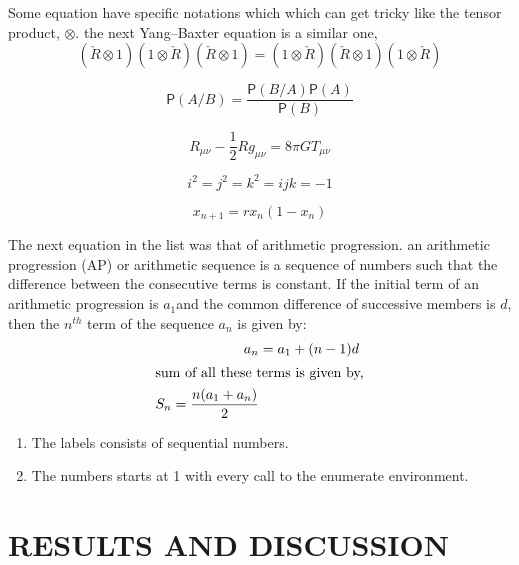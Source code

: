 \documentclass[12pt,a4paper]{report}
\newcommand*{\prob}{\mathsf{P}}
\begin{document}
Some equation have specific notations which which can get tricky like the tensor product, $\otimes$. the next Yang–Baxter equation is a similar one,
\begin{equation}
    \label{eq:7}
    (\check{R}\otimes1)(1\otimes\check{R})(\check{R}\otimes1) = (1\otimes\check{R})(\check{R}\otimes1)(1\otimes\check{R})
\end{equation}

\begin{equation}
    \label{eq:8}
    \prob(A/B) = \frac{\prob (B/A)  \prob (A)}{\prob (B)}
\end{equation}

\begin{equation}
    \label{eq:9}
    R_{\mu\nu} - \frac{1}{2}Rg_{\mu\nu} = 8\pi G T_{\mu\nu}
\end{equation}

\begin{equation}
    \label{eq:10}
    i^{2} = j^{2} = k^{2} = ijk = -1
\end{equation}

\begin{equation}
    \label{eq:11}
    x_{n+1} = rx_{n}(1-x_{n})
\end{equation}

The next equation in the list was that of arithmetic  progression. an arithmetic progression (AP) or arithmetic sequence is a sequence of numbers such that the difference between the consecutive terms is constant. If the initial term of an arithmetic progression is $a_{1}$and the common difference of successive members is $d$, then the $n^{th}$ term of the sequence $a_{n}$ is given by:
\begin{subequations}
    \begin{align}   
       a_{n} &= a_{1} + (n-1)d  \label{eq:12_a}\\
       \intertext{sum of all these terms is given by,}
       S_{n} = \frac{n(a_{1}+a_{n})}{2} \label{eq:12_b}
    \end{align}
\end{subequations}


\begin{enumerate}
  \item The labels consists of sequential numbers.
  \item The numbers starts at 1 with every call to the enumerate environment.
\end{enumerate}


\chapter{\MakeUppercase{{Results and Discussion}}}
\lipsum[1]
\end{document}
